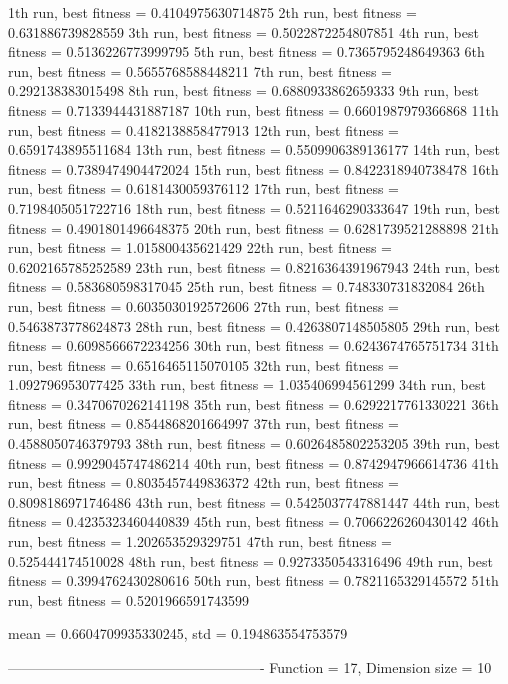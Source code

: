 1th run, best fitness = 0.4104975630714875
2th run, best fitness = 0.631886739828559
3th run, best fitness = 0.5022872254807851
4th run, best fitness = 0.5136226773999795
5th run, best fitness = 0.7365795248649363
6th run, best fitness = 0.5655768588448211
7th run, best fitness = 0.292138383015498
8th run, best fitness = 0.6880933862659333
9th run, best fitness = 0.7133944431887187
10th run, best fitness = 0.6601987979366868
11th run, best fitness = 0.4182138858477913
12th run, best fitness = 0.6591743895511684
13th run, best fitness = 0.5509906389136177
14th run, best fitness = 0.7389474904472024
15th run, best fitness = 0.8422318940738478
16th run, best fitness = 0.6181430059376112
17th run, best fitness = 0.7198405051722716
18th run, best fitness = 0.5211646290333647
19th run, best fitness = 0.4901801496648375
20th run, best fitness = 0.6281739521288898
21th run, best fitness = 1.015800435621429
22th run, best fitness = 0.6202165785252589
23th run, best fitness = 0.8216364391967943
24th run, best fitness = 0.583680598317045
25th run, best fitness = 0.748330731832084
26th run, best fitness = 0.6035030192572606
27th run, best fitness = 0.5463873778624873
28th run, best fitness = 0.4263807148505805
29th run, best fitness = 0.6098566672234256
30th run, best fitness = 0.6243674765751734
31th run, best fitness = 0.6516465115070105
32th run, best fitness = 1.092796953077425
33th run, best fitness = 1.035406994561299
34th run, best fitness = 0.3470670262141198
35th run, best fitness = 0.6292217761330221
36th run, best fitness = 0.8544868201664997
37th run, best fitness = 0.4588050746379793
38th run, best fitness = 0.6026485802253205
39th run, best fitness = 0.9929045747486214
40th run, best fitness = 0.8742947966614736
41th run, best fitness = 0.8035457449836372
42th run, best fitness = 0.8098186971746486
43th run, best fitness = 0.5425037747881447
44th run, best fitness = 0.4235323460440839
45th run, best fitness = 0.7066226260430142
46th run, best fitness = 1.202653529329751
47th run, best fitness = 0.525444174510028
48th run, best fitness = 0.9273350543316496
49th run, best fitness = 0.3994762430280616
50th run, best fitness = 0.7821165329145572
51th run, best fitness = 0.5201966591743599

mean = 0.6604709935330245, std = 0.194863554753579

-------------------------------------------------------
Function = 17, Dimension size = 10

